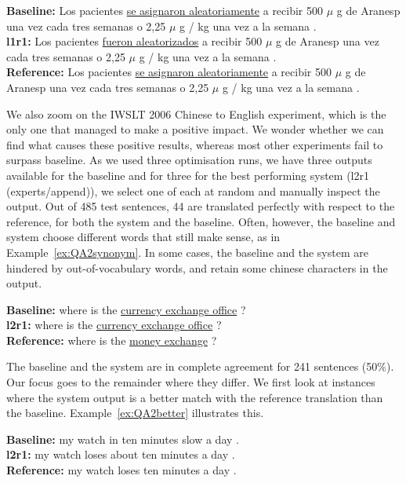 \begin{exe}
\footnotesize
\ex \textbf{Baseline:} Los pacientes \underline{se asignaron aleatoriamente} a recibir 500 $\mu$ g de Aranesp una vez cada tres semanas o 2,25 $\mu$ g / kg una vez a la semana . \\
\textbf{l1r1:} Los pacientes \underline{fueron aleatorizados} a recibir 500 $\mu$ g de Aranesp una vez cada tres semanas o 2,25 $\mu$ g / kg una vez a la semana . \\
\textbf{Reference:} Los pacientes \underline{se asignaron aleatoriamente} a recibir 500 $\mu$ g de Aranesp una vez cada tres semanas o 2,25 $\mu$ g / kg una vez a la semana .
\label{ex:QAnegative}
\end{exe}

We also zoom on the IWSLT 2006 Chinese to English experiment, which is the only
one that managed to make a positive impact. We wonder whether we can find what
causes these positive results, whereas most other experiments fail to surpass
baseline. As we used three optimisation runs, we have three outputs available
for the baseline and for three for the best performing system (l2r1 (experts/append)), we
select one of each at random and manually inspect the output.
Out of 485 test sentences, 44 are translated perfectly with respect to the
reference, for both the system and the baseline. Often, however, the baseline
and system choose different words that still make sense, as in
Example~\ref{ex:QA2synonym}. In some cases, the baseline and the system are
hindered by out-of-vocabulary words, and retain some chinese characters in the
output.

\begin{exe}
\footnotesize
\ex \textbf{Baseline:} where is the \underline{currency exchange office} ?  \\
\textbf{l2r1:} where is the \underline{currency exchange office} ? \\
\textbf{Reference:} where is the \underline{money exchange} ?
\label{ex:QA2synonym}
\end{exe}

The baseline and the system are in complete agreement for 241 sentences (50\%).
Our focus goes to the remainder where they differ.  We first look at instances
where the system output is a better match with the reference translation than
the baseline. Example~\ref{ex:QA2better} illustrates this.

\begin{exe}
\footnotesize
\ex \textbf{Baseline:}  my watch in ten minutes slow a day .  \\
\textbf{l2r1:} my watch loses about ten minutes a day .  \\
\textbf{Reference:} my watch loses ten minutes a day .
\label{ex:QA2better}
\end{exe}

